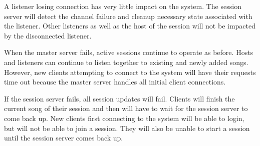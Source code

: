 A listener losing connection has very little impact on the system. The session
server will detect the channel failure and cleanup necessary state
associated with the listener. Other listeners as well as the host
of the session will not be impacted by the disconnected listener.

When the master server fails, active sessions continue to
operate as before. Hosts and listeners can continue to listen
together to existing and newly added songs. However, new clients
attempting to connect to the system will have their requests time
out because the master server handles all initial client connections.

If the session server fails, all session updates will fail.
Clients will finish the current song of their session and then
will have to wait for the session server to come back up. New clients
first connecting to the system will be able to login, but will not
be able to join a session. They will also be unable to start a session until
the session server comes back up.
